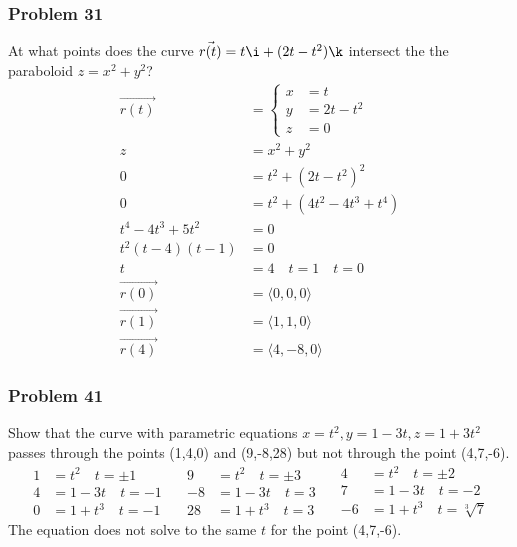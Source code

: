 \documentclass[letterpaper, 12pt]{math}
\begin{document}
\subsubsection*{Problem 31}
At what points does the curve \( \vec{r(t)} = t\i+(2t-t^2)\k \) intersect the
the paraboloid \( z = x^2+y^2 \)?
\begin{align*}
  \vec{r(t)} &= \begin{cases}
    x &= t \\
    y &= 2t-t^2 \\
    z &= 0
  \end{cases} \\
  z &= x^2+y^2 \\
  0 &= t^2+(2t-t^2)^2 \\
  0 &= t^2+(4t^2-4t^3+t^4) \\
  t^4-4t^3+5t^2 &= 0 \\
  t^2(t-4)(t-1) &= 0 \\
  t &= 4 \quad t = 1 \quad t = 0 \\
  \vec{r(0)} &= \langle0,0,0\rangle \\
  \vec{r(1)} &= \langle1,1,0\rangle \\
  \vec{r(4)} &= \langle4,-8,0\rangle
\end{align*}

\subsubsection*{Problem 41}
Show that the curve with parametric equations \( x = t^2, y = 1-3t, z = 1+3t^2
\) passes through the points (1,4,0) and (9,-8,28) but not through the point
(4,7,-6).
\[ \begin{split}
  1 &= t^2 \quad t = \pm1 \\
  4 &= 1-3t \quad t = -1 \\
  0 &= 1+t^3 \quad t = -1
\end{split}\quad\begin{split}
  9 &= t^2 \quad t = \pm3 \\
  -8 &= 1-3t \quad t = 3 \\
  28 &= 1+t^3 \quad t = 3
\end{split}\quad\begin{split}
  4 &= t^2 \quad t = \pm2 \\
  7 &= 1-3t \quad t = -2 \\
  -6 &= 1+t^3 \quad t = \sqrt[3]{7}
\end{split} \]
The equation does not solve to the same \( t \) for the point (4,7,-6).
\end{document}
